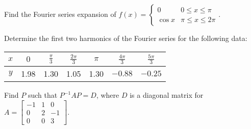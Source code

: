 \documentclass[a4paper,12pt]{vitexam}
\begin{document}
\begin{questions}

     

\question[10]  Find   the Fourier series expansion of 
$ f(x) = \begin{cases}
	0 & 0\leq x \leq \pi \\
	\cos x & \pi \leq x \leq  2\pi
\end{cases}.
$

     

\question[10]  Determine the first two harmonics of the Fourier series for the following data:

\begin{center}
\begin{tabular}{|c|c|c|c|c|c|c|}
	\hline 
	$x$ & $0$ & $\frac {\pi}{3}$ & $\frac {2\pi}{3}$ & $\pi$ & $\frac {4\pi}{3}$ & $\frac {5\pi}{3}$ \\ \hline 
	$y$ & 1.98&1.30&1.05&1.30& $-0.88$ &$-0.25$ \\ \hline 
\end{tabular}
\end{center}

     

\question[10] Find $P$ such that $P^{-1}AP = D$, where $D$ is a diagonal matrix for 
$A = \begin{bmatrix}
	-1 & 1 & 0 \\ 0 & 2 & -1 \\  0 & 0 & 3 
\end{bmatrix}.$

     

\question
{}


\end{questions}
\end{document}
